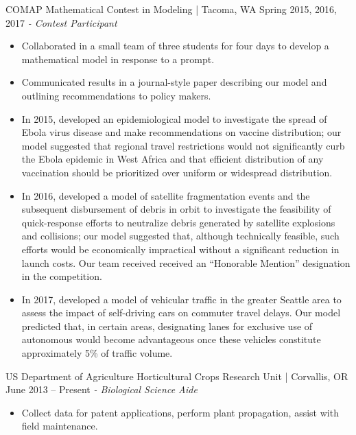 COMAP Mathematical Contest in Modeling | Tacoma, WA \hfill Spring 2015, 2016, 2017 \newline
\textit{- Contest Participant} \\
  \vspace{-4.5mm}
 \begin{itemize}
 \item Collaborated in a small team of three students for four days to develop a mathematical model in response to a prompt.
 \item Communicated results in a journal-style paper describing our model and outlining recommendations to policy makers.
 \item In 2015, developed an epidemiological model to investigate the spread of Ebola virus disease and make recommendations on vaccine distribution; our model suggested that regional travel restrictions would not significantly curb the Ebola epidemic in West Africa and that efficient distribution of any vaccination should be prioritized over uniform or widespread distribution.
 \item In 2016, developed a model of satellite fragmentation events and the subsequent disbursement of debris in orbit to investigate the feasibility of quick-response efforts to neutralize debris generated by satellite explosions and collisions; our model suggested that, although technically feasible, such efforts would be economically impractical without a significant reduction in launch costs. Our team received received an ``Honorable Mention'' designation in the competition.
 \item In 2017, developed a model of vehicular traffic in the greater Seattle area to assess the impact of self-driving cars on commuter travel delays. Our model predicted that, in certain areas, designating lanes for exclusive use of autonomous would become advantageous once these vehicles constitute approximately 5\% of traffic volume.
 \end{itemize}
  \vspace{-3.5mm}

US Department of Agriculture Horticultural Crops Research Unit | Corvallis, OR  \hfill  June 2013 – Present \newline
\textit{- Biological Science Aide}\\
  \vspace{-4.5mm}
 \begin{itemize}
 \item Collect data for patent applications, perform plant propagation, assist with field maintenance.
 \end{itemize}
  \vspace{-3.5mm}

